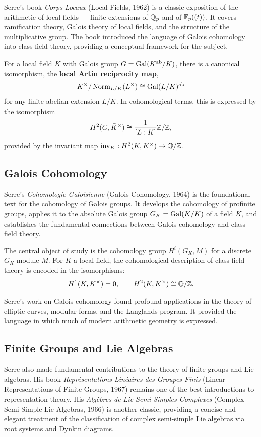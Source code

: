Serre's book \textit{Corps Locaux} (Local Fields, 1962) is a classic exposition of the arithmetic of local fields --- finite extensions of \(\mathbb{Q}_p\) and of \(\mathbb{F}_p((t))\). It covers ramification theory, Galois theory of local fields, and the structure of the multiplicative group. The book introduced the language of Galois cohomology into class field theory, providing a conceptual framework for the subject.

\begin{theorem}
For a local field \(K\) with Galois group \(G = \operatorname{Gal}(K^{\text{ab}}/K)\), there is a canonical isomorphism, the \textbf{local Artin reciprocity map},
\[
K^\times / \operatorname{Norm}_{L/K}(L^\times) \cong \operatorname{Gal}(L/K)^{\text{ab}}
\]
for any finite abelian extension \(L/K\). In cohomological terms, this is expressed by the isomorphism
\[
H^2(G, \bar{K}^\times) \cong \frac{1}{[L:K]} \mathbb{Z} / \mathbb{Z},
\]
provided by the invariant map \(\operatorname{inv}_K: H^2(K, \bar{K}^\times) \to \mathbb{Q}/\mathbb{Z}\).
\end{theorem}

\subsection{Galois Cohomology}

Serre's \textit{Cohomologie Galoisienne} (Galois Cohomology, 1964) is the foundational text for the cohomology of Galois groups. It develops the cohomology of profinite groups, applies it to the absolute Galois group \(G_K = \operatorname{Gal}(\bar{K}/K)\) of a field \(K\), and establishes the fundamental connections between Galois cohomology and class field theory.

The central object of study is the cohomology group \(H^i(G_K, M)\) for a discrete \(G_K\)-module \(M\). For \(K\) a local field, the cohomological description of class field theory is encoded in the isomorphisms:
\[
H^1(K, \bar{K}^\times) = 0, \qquad H^2(K, \bar{K}^\times) \cong \mathbb{Q}/\mathbb{Z}.
\]

Serre's work on Galois cohomology found profound applications in the theory of elliptic curves, modular forms, and the Langlands program. It provided the language in which much of modern arithmetic geometry is expressed.

\subsection{Finite Groups and Lie Algebras}

Serre also made fundamental contributions to the theory of finite groups and Lie algebras. His book \textit{Repr\'esentations Lin\'eaires des Groupes Finis} (Linear Representations of Finite Groups, 1967) remains one of the best introductions to representation theory. His \textit{Alg\`ebres de Lie Semi-Simples Complexes} (Complex Semi-Simple Lie Algebras, 1966) is another classic, providing a concise and elegant treatment of the classification of complex semi-simple Lie algebras via root systems and Dynkin diagrams.

